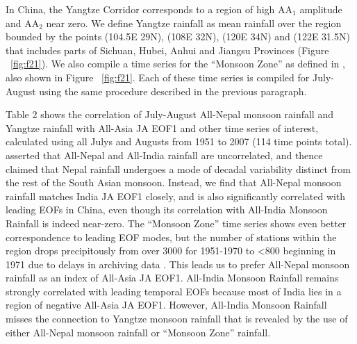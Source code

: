 	In China, the Yangtze Corridor corresponds to a region of high AA$_1$ amplitude and AA$_2$ near zero. We define Yangtze rainfall as mean rainfall over the region bounded by the points (104.5\textdegree E 29\textdegree N), (108\textdegree E 32\textdegree N), (120\textdegree E 34\textdegree N) and (122\textdegree E 31.5\textdegree N) that includes parts of Sichuan, Hubei, Anhui and Jiangsu Provinces (Figure ~\ref{fig:f21}). We also compile a time series for the ``Monsoon Zone'' as defined in \cite{Gadgil2003}, also shown in Figure ~\ref{fig:f21}. Each of these time series is compiled for July-August using the same procedure described in the previous paragraph.
	
	Table 2 shows the correlation of July-August All-Nepal monsoon rainfall and Yangtze rainfall with All-Asia JA EOF1 and other time series of interest, calculated using all Julys and Augusts from 1951 to 2007 (114 time points total). \cite{Wang2012} asserted that All-Nepal and All-India rainfall are uncorrelated, and thence claimed that Nepal rainfall undergoes a mode of decadal variability distinct from the rest of the South Asian monsoon. Instead, we find that All-Nepal monsoon rainfall matches India JA EOF1 closely, and is also significantly correlated with leading EOFs in China, even though its correlation with All-India Monsoon Rainfall is indeed near-zero. The ``Monsoon Zone'' time series shows even better correspondence to leading EOF modes, but the number of stations within the region drops precipitously from over 3000 for 1951-1970 to \textless800 beginning in 1971 due to delays in archiving data \citep{Rajeevan2006}. This leads us to prefer All-Nepal monsoon rainfall as an index of All-Asia JA EOF1. All-India Monsoon Rainfall remains strongly correlated with leading temporal EOFs because most of India lies in a region of negative All-Asia JA EOF1. However, All-India Monsoon Rainfall misses the connection to Yangtze monsoon rainfall that is revealed by the use of either All-Nepal monsoon rainfall or ``Monsoon Zone'' rainfall.
	
